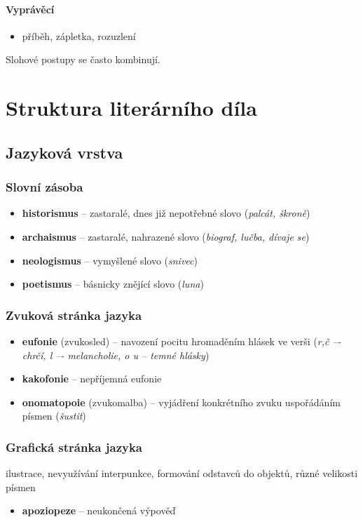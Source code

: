 \paragraph{Vyprávěcí}
\begin{itemize}
\item příběh, zápletka, rozuzlení
\end{itemize}
Slohové postupy se často kombinují.

\newpage
\section{Struktura literárního díla}
\subsection{Jazyková vrstva}
\subsubsection{Slovní zásoba}
\begin{itemize}
\item[] \textbf{historismus} -- zastaralé, dnes již nepotřebné slovo (\textit{palcát, škroně})
\item[] \textbf{archaismus} -- zastaralé, nahrazené slovo (\textit{biograf, lučba, dívaje se})
\item[] \textbf{neologismus} -- vymyšlené slovo (\textit{snivec})
\item[] \textbf{poetismus} -- básnicky znějící slovo (\textit{luna})
\end{itemize}

\subsubsection{Zvuková stránka jazyka}
\begin{itemize}
\item[] \textbf{eufonie} (zvukosled) -- navození pocitu hromaděním hlásek ve verši (\textit{r,č –- chrčí, l –- melancholie, o u -- temné hlásky})
\item[] \textbf{kakofonie} -- nepříjemná eufonie
\item[] \textbf{onomatopoie} (zvukomalba) -- vyjádření konkrétního zvuku uspořádáním písmen (\textit{šustit})
\end{itemize}

\subsubsection{Grafická stránka jazyka}
ilustrace, nevyužívání interpunkce, formování odstavců do objektů, různé velikosti písmen
\begin{itemize}
\item[] \textbf{apoziopeze} -- neukončená výpověď
\end{itemize}


